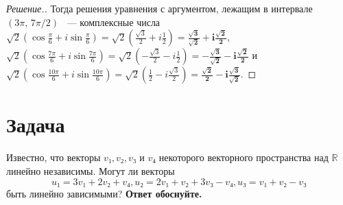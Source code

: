\documentclass[a4paper]{article}
\theoremstyle{remark}
\begin{document}
\begin{proof}[Решение.]
        Тогда решения уравнения с аргументом, лежащим в интервале $(3\pi,\, 7\pi/2)$ ~--- комплексные числа $\sqrt{2} \left( \cos \frac{\pi}{6} + i \sin \frac{\pi}{6} \right) =\sqrt{2} \left( \frac{\sqrt{3}}{2} + i \frac{1}{2} \right) = \bm{\frac{\sqrt{3}}{\sqrt{2}} + i\frac{\sqrt{2}}{2}}$, $\sqrt{2} \left( \cos \frac{7\pi}{6} + i \sin \frac{7\pi}{6} \right) =\sqrt{2} \left( -\frac{\sqrt{3}}{2} - i \frac{1}{2} \right) = \bm{-\frac{\sqrt{3}}{\sqrt{2}} - i\frac{\sqrt{2}}{2}}$ и $\sqrt{2} \left( \cos \frac{10\pi}{6} + i \sin \frac{10\pi}{6} \right) =\sqrt{2} \left( \frac{1}{2} - i \frac{\sqrt{3}}{2} \right) = \bm{\frac{\sqrt{2}}{2} - i\frac{\sqrt{3}}{\sqrt{2}}}$.

      \end{proof}
    
    \section*{Задача }
      Известно, что векторы  $v₁, v₂, v₃$ и $v₄$ некоторого векторного
      пространства над $\mathbb{R}$ линейно независимы. Могут ли
      векторы \\
      \[u₁ = 3v₁ + 2v₂ + v₄, u₂ = 2v₁ + v₂ + 3v₃ - v₄,
       u₃ = v₁ + v₂ - v₃ \] 
       быть линейно зависимыми? \textbf{Ответ обоснуйте.}
\end{document}
